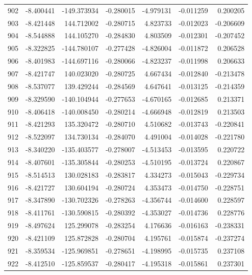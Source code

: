 \begin{tabular}{rrrrrrr}
 902 &  -8.400441 & -149.373934 & -0.280015 &   -4.979131 &   -0.011259 &  0.200205 \\
 903 &  -8.421448 &  144.712002 & -0.280715 &    4.823733 &   -0.012023 & -0.206609 \\
 904 &  -8.544888 &  144.105270 & -0.284830 &    4.803509 &   -0.012301 & -0.207452 \\
 905 &  -8.322825 & -144.780107 & -0.277428 &   -4.826004 &   -0.011872 &  0.206528 \\
 906 &  -8.401983 & -144.697116 & -0.280066 &   -4.823237 &   -0.011998 &  0.206633 \\
 907 &  -8.421747 &  140.023020 & -0.280725 &    4.667434 &   -0.012840 & -0.213478 \\
 908 &  -8.537077 &  139.429244 & -0.284569 &    4.647641 &   -0.013125 & -0.214359 \\
 909 &  -8.329590 & -140.104944 & -0.277653 &   -4.670165 &   -0.012685 &  0.213371 \\
 910 &  -8.406418 & -140.008450 & -0.280214 &   -4.666948 &   -0.012819 &  0.213503 \\
 911 &  -8.421293 &  135.320472 & -0.280710 &    4.510682 &   -0.013743 & -0.220841 \\
 912 &  -8.522097 &  134.730134 & -0.284070 &    4.491004 &   -0.014028 & -0.221780 \\
 913 &  -8.340220 & -135.403577 & -0.278007 &   -4.513453 &   -0.013595 &  0.220722 \\
 914 &  -8.407601 & -135.305844 & -0.280253 &   -4.510195 &   -0.013724 &  0.220867 \\
 915 &  -8.514513 &  130.028183 & -0.283817 &    4.334273 &   -0.015043 & -0.229734 \\
 916 &  -8.421727 &  130.604194 & -0.280724 &    4.353473 &   -0.014750 & -0.228751 \\
 917 &  -8.347890 & -130.702326 & -0.278263 &   -4.356744 &   -0.014600 &  0.228597 \\
 918 &  -8.411761 & -130.590815 & -0.280392 &   -4.353027 &   -0.014736 &  0.228776 \\
 919 &  -8.497624 &  125.299078 & -0.283254 &    4.176636 &   -0.016163 & -0.238331 \\
 920 &  -8.421109 &  125.872828 & -0.280704 &    4.195761 &   -0.015874 & -0.237274 \\
 921 &  -8.359534 & -125.969851 & -0.278651 &   -4.198995 &   -0.015735 &  0.237108 \\
 922 &  -8.412510 & -125.859537 & -0.280417 &   -4.195318 &   -0.015861 &  0.237301 \\

\end{tabular}
